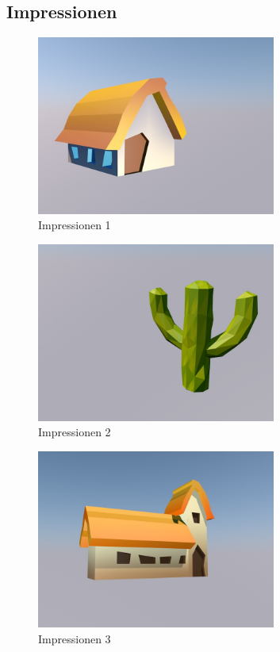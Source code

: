 \subsection{Impressionen}

\begin{figure}[!htbp]%
	\centering
		\includegraphics[width=0.7\textwidth]{images/anhang_1}
	\caption{Impressionen 1}
	\label{fig:Impressionen}
\end{figure}

\begin{figure}[!htbp]%
	\centering
		\includegraphics[width=0.7\textwidth]{images/anhang_2}
	\caption{Impressionen 2}
	\label{fig:Impressionen}
\end{figure}

\begin{figure}[!htbp]%
	\centering
		\includegraphics[width=0.7\textwidth]{images/anhang_3}
	\caption{Impressionen 3}
	\label{fig:Impressionen}
\end{figure}

